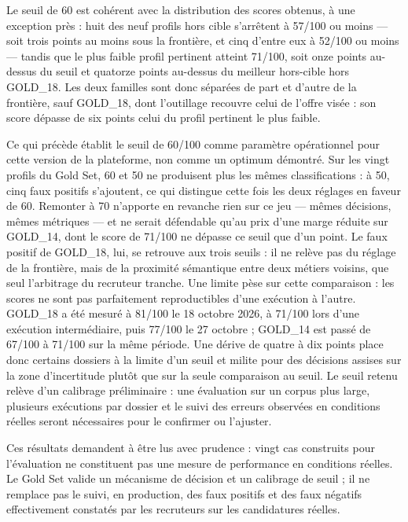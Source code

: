 Le seuil de 60 est cohérent avec la distribution des scores obtenus, à une exception près : huit des neuf profils hors cible s’arrêtent à 57/100 ou moins — soit trois points au moins sous la frontière, et cinq d’entre eux à 52/100 ou moins — tandis que le plus faible profil pertinent atteint 71/100, soit onze points au-dessus du seuil et quatorze points au-dessus du meilleur hors-cible hors GOLD\_18. Les deux familles sont donc séparées de part et d’autre de la frontière, sauf GOLD\_18, dont l’outillage recouvre celui de l’offre visée : son score dépasse de six points celui du profil pertinent le plus faible.

Ce qui précède établit le seuil de 60/100 comme paramètre opérationnel pour cette version de la plateforme, non comme un optimum démontré. Sur les vingt profils du Gold Set, 60 et 50 ne produisent plus les mêmes classifications : à 50, cinq faux positifs s’ajoutent, ce qui distingue cette fois les deux réglages en faveur de 60. Remonter à 70 n’apporte en revanche rien sur ce jeu — mêmes décisions, mêmes métriques — et ne serait défendable qu’au prix d’une marge réduite sur GOLD\_14, dont le score de 71/100 ne dépasse ce seuil que d’un point. Le faux positif de GOLD\_18, lui, se retrouve aux trois seuils : il ne relève pas du réglage de la frontière, mais de la proximité sémantique entre deux métiers voisins, que seul l’arbitrage du recruteur tranche. Une limite pèse sur cette comparaison : les scores ne sont pas parfaitement reproductibles d’une exécution à l’autre. GOLD\_18 a été mesuré à 81/100 le 18 octobre 2026, à 71/100 lors d’une exécution intermédiaire, puis 77/100 le 27 octobre ; GOLD\_14 est passé de 67/100 à 71/100 sur la même période. Une dérive de quatre à dix points place donc certains dossiers à la limite d’un seuil et milite pour des décisions assises sur la zone d’incertitude plutôt que sur la seule comparaison au seuil. Le seuil retenu relève d’un calibrage préliminaire : une évaluation sur un corpus plus large, plusieurs exécutions par dossier et le suivi des erreurs observées en conditions réelles seront nécessaires pour le confirmer ou l’ajuster.

Ces résultats demandent à être lus avec prudence : vingt cas construits pour l’évaluation ne constituent pas une mesure de performance en conditions réelles. Le Gold Set valide un mécanisme de décision et un calibrage de seuil ; il ne remplace pas le suivi, en production, des faux positifs et des faux négatifs effectivement constatés par les recruteurs sur les candidatures réelles.

